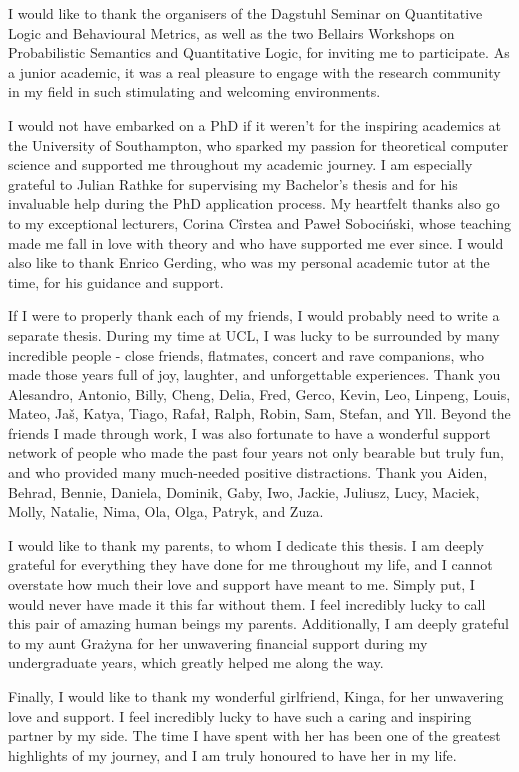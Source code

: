 \begin{acknowledgements}
I would like to thank the organisers of the Dagstuhl Seminar on Quantitative Logic and Behavioural Metrics, as well as the two Bellairs Workshops on Probabilistic Semantics and Quantitative Logic, for inviting me to participate. As a junior academic, it was a real pleasure to engage with the research community in my field in such stimulating and welcoming environments.

I would not have embarked on a PhD if it weren’t for the inspiring academics at the University of Southampton, who sparked my passion for theoretical computer science and supported me throughout my academic journey. I am especially grateful to Julian Rathke for supervising my Bachelor's thesis and for his invaluable help during the PhD application process. My heartfelt thanks also go to my exceptional lecturers, Corina Cîrstea and Paweł Sobociński, whose teaching made me fall in love with theory and who have supported me ever since. I would also like to thank Enrico Gerding, who was my personal academic tutor at the time, for his guidance and support.

If I were to properly thank each of my friends, I would probably need to write a separate thesis. During my time at UCL, I was lucky to be surrounded by many incredible people - close friends, flatmates, concert and rave companions, who made those years full of joy, laughter, and unforgettable experiences. Thank you Alesandro, Antonio, Billy, Cheng, Delia, Fred, Gerco, Kevin, Leo, Linpeng, Louis, Mateo, Jaš, Katya, Tiago, Rafał, Ralph, Robin, Sam, Stefan, and Yll.
Beyond the friends I made through work, I was also fortunate to have a wonderful support network of people who made the past four years not only bearable but truly fun, and who provided many much-needed positive distractions. Thank you Aiden, Behrad, Bennie, Daniela, Dominik, Gaby, Iwo, Jackie, Juliusz, Lucy, Maciek, Molly, Natalie, Nima, Ola, Olga, Patryk, and Zuza.

I would like to thank my parents, to whom I dedicate this thesis. I am deeply grateful for everything they have done for me throughout my life, and I cannot overstate how much their love and support have meant to me. Simply put, I would never have made it this far without them. I feel incredibly lucky to call this pair of amazing human beings my parents. Additionally, I am deeply grateful to my aunt Grażyna for her unwavering financial support during my undergraduate years, which greatly helped me along the way.

Finally, I would like to thank my wonderful girlfriend, Kinga, for her unwavering love and support. I feel incredibly lucky to have such a caring and inspiring partner by my side. The time I have spent with her has been one of the greatest highlights of my journey, and I am truly honoured to have her in my life.
\end{acknowledgements}

\setcounter{tocdepth}{2} 

\tableofcontents
\listoffigures

